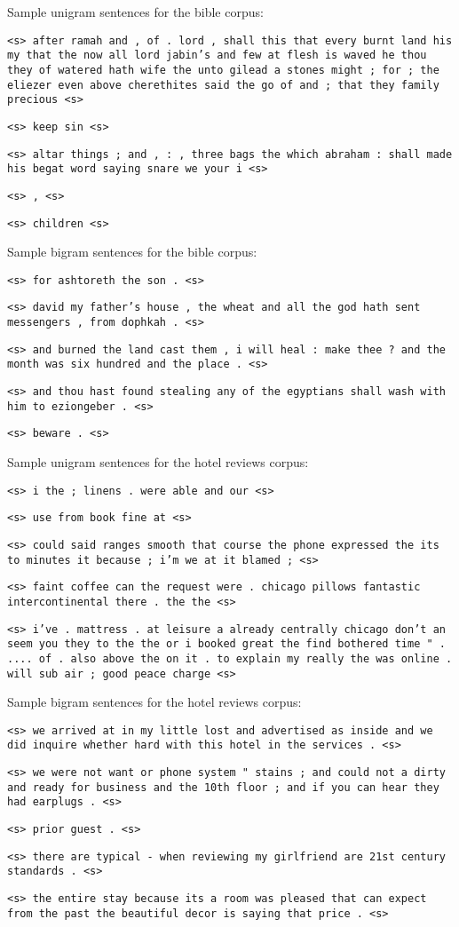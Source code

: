 \documentclass{article}
\begin{document}
\begin{adjustwidth}{0.5in}{0.5in}
\setlength{\parindent}{-0.25in}
\newcommand\npar{\par}
Sample unigram sentences for the bible corpus:\npar
{\small
\texttt{<s> after ramah and , of . lord , shall this that every burnt land his my that the now all lord jabin's and few at flesh is waved he thou they of watered hath wife the unto gilead a stones might ; for ; the eliezer even above cherethites said the go of and ; that they family precious <s>}\npar
\texttt{<s> keep sin <s>}\npar
\texttt{<s> altar things ; and , : , three bags the which abraham : shall made his begat word saying snare we your i <s>}\npar
\texttt{<s> , <s>}\npar
\texttt{<s> children <s>}\npar
}\bigskip

Sample bigram sentences for the bible corpus:\npar
{\small
\texttt{<s> for ashtoreth the son . <s>}\npar
\texttt{<s> david my father's house , the wheat and all the god hath sent messengers , from dophkah . <s>}\npar
\texttt{<s> and burned the land cast them , i will heal : make thee ? and the month was six hundred and the place . <s>}\npar
\texttt{<s> and thou hast found stealing any of the egyptians shall wash with him to eziongeber . <s>}\npar
\texttt{<s> beware . <s>}\npar
}\bigskip\bigskip

Sample unigram sentences for the hotel reviews corpus:\npar
{\small
\texttt{<s> i the ; linens . were able and our <s>}\npar
\texttt{<s> use from book fine at <s>}\npar
\texttt{<s> could said ranges smooth that course the phone expressed the its to minutes it because ; i'm we at it blamed ; <s>}\npar
\texttt{<s> faint coffee can the request were . chicago pillows fantastic intercontinental there . the the <s>}\npar
\texttt{<s> i've . mattress . at leisure a already centrally chicago don't an seem you they to the the or i booked great the find bothered time " . .... of . also above the on it . to explain my really the was online . will sub air ; good peace charge <s>}\npar
}\bigskip

Sample bigram sentences for the hotel reviews corpus:\npar
\texttt{<s> we arrived at in my little lost and advertised as inside and we did inquire whether hard with this hotel in the services . <s>}\npar
\texttt{<s> we were not want or phone system " stains ; and could not a dirty and ready for business and the 10th floor ; and if you can hear they had earplugs . <s>}\npar
\texttt{<s> prior guest . <s>}\npar
\texttt{<s> there are typical - when reviewing my girlfriend are 21st century standards . <s>}\npar
\texttt{<s> the entire stay because its a room was pleased that can expect from the past the beautiful decor is saying that price . <s>}\npar
\end{adjustwidth}
\end{document}
